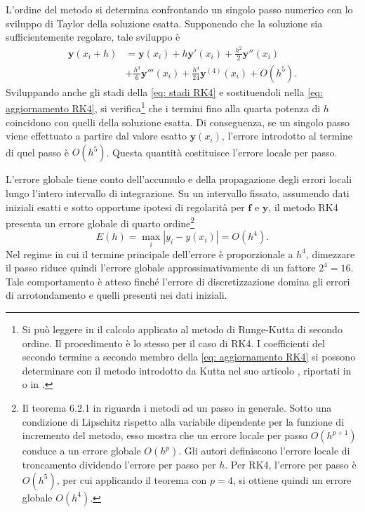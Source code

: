 \documentclass{article}
\newcommand{\supcite}[2][]{\textsuperscript{\cite[#1]{#2}}}
\numberwithin{equation}{section}
\begin{document}
L'ordine del metodo si determina confrontando un singolo passo numerico con lo sviluppo di Taylor della soluzione esatta. Supponendo che la soluzione sia sufficientemente regolare, tale sviluppo è
\begin{equation}
\label{eq: Taylor soluzione esatta RK4}
    \begin{aligned}
        \bm{y}(x_i+h) &= \bm{y}(x_i)
        + h\bm{y}'(x_i)
        + \frac{h^2}{2}\bm{y}''(x_i) \\
        &+ \frac{h^3}{6}\bm{y}'''(x_i)
        + \frac{h^4}{24}\bm{y}^{(4)}(x_i)
        + O(h^5).
    \end{aligned}
\end{equation}
Sviluppando anche gli stadi della \eqref{eq: stadi RK4} e sostituendoli nella \eqref{eq: aggiornamento RK4}, si verifica\footnote{Si può leggere in \cite[sez.~6.4.1]{driscoll2018} il calcolo applicato al metodo di Runge-Kutta di secondo ordine. Il procedimento è lo stesso per il caso di RK4. I coefficienti del secondo termine a secondo membro della \eqref{eq: aggiornamento RK4} si possono determinare con il metodo introdotto da Kutta nel suo articolo \cite{kutta1901}, riportati in \cite[pg.~249]{butcher1996} o in \cite[sez.~6.4.3]{driscoll2018}.} che i termini fino alla quarta potenza di $h$ coincidono con quelli della soluzione esatta. Di conseguenza, se un singolo passo viene effettuato a partire dal valore esatto $\bm{y}(x_i)$, l'errore introdotto al termine di quel passo è $O(h^5)$. Questa quantità costituisce l'errore locale per passo\supcite[sez.~16.1]{press1992}.

L'errore globale tiene conto dell'accumulo e della propagazione degli errori locali lungo l'intero intervallo di integrazione. Su un intervallo fissato, assumendo dati iniziali esatti e sotto opportune ipotesi di regolarità per $\bm{f}$ e $\bm{y}$, il metodo RK4 presenta un errore globale di quarto ordine\footnote{Il teorema 6.2.1 in \cite[sez.~6.2.2]{driscoll2018} riguarda i metodi ad un passo in generale. Sotto una condizione di Lipschitz rispetto alla variabile dipendente per la funzione di incremento del metodo, esso mostra che un errore locale per passo $O(h^{p+1})$ conduce a un errore globale $O(h^p)$. Gli autori definiscono l'errore locale di troncamento dividendo l'errore per passo per $h$. Per RK4, l'errore per passo è $O(h^5)$, per cui applicando il teorema con $p = 4$, si ottiene quindi un errore globale $O(h^4)$.}
\begin{equation}
    E(h) = \max_i{|y_i-y(x_i)|} = O(h^4).
\end{equation}
Nel regime in cui il termine principale dell'errore è proporzionale a $h^4$, dimezzare il passo riduce quindi l'errore globale approssimativamente di un fattore $2^4 = 16$. Tale comportamento è atteso finché l'errore di discretizzazione domina gli errori di arrotondamento e quelli presenti nei dati iniziali.
\end{document}
